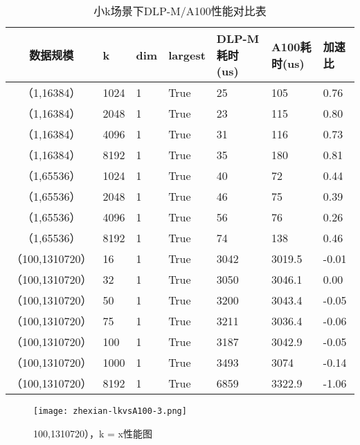 \begin{table}
    \centering
    \caption{小k场景下DLP-M/A100性能对比表}
    \begin{tabular}{cllllll}
    \toprule
    数据规模 & k  & dim & largest &   DLP-M耗时(us) & A100耗时(us) & 加速比 \\
    \midrule
    （1,16384） & 1024 &  1     & True        & 25 & 105 & 0.76 \\
    （1,16384） & 2048 &  1     & True       & 23 & 115 & 0.80 \\
    （1,16384） & 4096 &  1     & True       & 31 & 116 & 0.73 \\
    （1,16384） & 8192 &  1     & True       & 35 & 180 & 0.81 \\
    （1,65536） & 1024 &  1     & True        & 40 & 72 & 0.44 \\
    （1,65536） & 2048 &  1     & True        & 46 & 75 & 0.39 \\
    （1,65536） & 4096 &  1     & True        & 56 & 76 & 0.26 \\
    （1,65536） & 8192 &  1     & True       & 74 & 138 & 0.46 \\

    

    （100,1310720） &16 &  1     & True          & 3042 & 3019.5 &  -0.01\\
    （100,1310720） &32 &  1     & True     &  3050& 3046.1 &  0.00\\
    （100,1310720） &50 &  1     & True      & 3200 & 3043.4 &  -0.05 \\
    （100,1310720） &75  &  1     & True      & 3211 & 3036.4 &  -0.06 \\
    （100,1310720） &100  &  1     & True       & 3187& 3042.9 &  -0.05 \\
    （100,1310720） &1000 &  1     & True       & 3493& 3074   &   -0.14 \\
    （100,1310720） &8192 &  1     & True        & 6859& 3322.9 & -1.06 \\

    \bottomrule
    \end{tabular}
\label{tab:lkvsa100}    
\end{table}
\begin{figure}
    \centering
    \texttt{[image: zhexian-lkvsA100-3.png]}
    \caption{100,1310720），k = x性能图}
    \label{fig:bench_littlek_vsa100_2_zhexian}
\end{figure}

